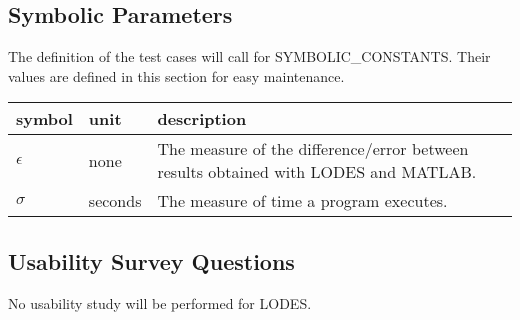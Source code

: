 \documentclass[12pt, titlepage]{article}
\newcommand{\famname}{LODES} %
\begin{document}

\pagebreak

\subsection{Symbolic Parameters}

The definition of the test cases will call for SYMBOLIC\_CONSTANTS.
Their values are defined in this section for easy maintenance.

\renewcommand{\arraystretch}{1.2}
\noindent \begin{longtable*}{l l p{12cm}} \toprule
\textbf{symbol} & \textbf{unit} & \textbf{description}\\
\midrule
$\epsilon$ & none & The measure of the difference/error between results obtained with \famname{}
and MATLAB.\\
$\sigma$ & seconds & The measure of time a program executes.\\

\bottomrule
\end{longtable*}

\subsection{Usability Survey Questions}
No usability study will be performed for \famname{}.

\end{document}

